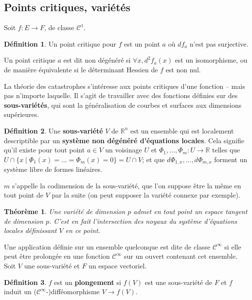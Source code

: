 \documentclass{article}
\newcommand{\cun}{\mathcal{C}^1}
\newcommand{\cinf}{\mathcal{C}^\infty}
\newcommand{\R}{\mathbb{R}}
\newtheorem{thm}{Théorème}
\theoremstyle{definition}
\newtheorem{defn}{Définition}
\begin{document}
\subsection{Points critiques, variétés}

Soit $f:E\to F$, de classe $\cun$.
\begin{defn}
	Un point critique pour $f$ est un point $a$ où $df_a$ n'est pas surjective.

	Un point critique $a$ est dit non dégénéré si $\forall x, d^2f_a(x)$ est un isomorphisme, ou de manière équivalente si le déterminant Hessien de $f$ est non nul.
\end{defn}

La théorie des catastrophes s'intéresse aux points critiques d'une fonction -- mais pas n'importe laquelle.
Il s'agit de travailler avec des fonctions définies sur des \textbf{sous-variétés}, qui sont la généralisation de courbes et surfaces aux dimensions supérieures.

\begin{defn}
	Une \textbf{sous-variété} $V$ de $\R^n$ est un ensemble qui est localement descriptible par un \textbf{système non dégénéré d'équations locales}.
	Cela signifie qu'il existe pour tout point $a\in V$ un voisinage $U$ et $\Phi_1,...,\Phi_m: U \to\R$ telles que $U\cap\{x\mid \Phi_1(x)=...=\Phi_m(x)=0\}=U\cap V$; et que $d\Phi_{1,x},...,d\Phi_{m,x}$ forment un système libre de formes linéaires.

	$m$ s'appelle la codimension de la sous-variété, que l'on suppose être la même en tout point de $V$ par la suite (on peut supposer la variété connexe par exemple).
\end{defn}

\begin{thm}
	Une variété de dimension $p$ admet en tout point un espace tangent de dimension $p$.
	C'est en fait l'intersection des noyaux du système d'équations locales définissant $V$ en ce point.
\end{thm}

Une application définie sur un ensemble quelconque est dite de classe $\cinf$ si elle peut être prolongée en une fonction $\cinf$ sur un ouvert contenant cet ensemble. Soit $V$ une sous-variété et $F$ un espace vectoriel.

\begin{defn}

	$f$ est un \textbf{plongement} si $f(V)$ est une sous-variété de $F$ et $f$ induit un ($\cinf$-)difféomorphisme $V\to f(V)$.
\end{defn}
\end{document}
